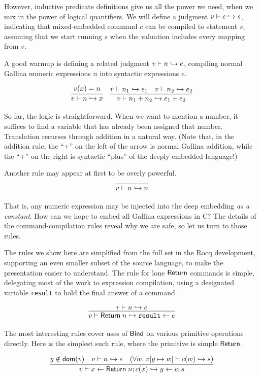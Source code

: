 \documentclass{amsbook}
\theoremstyle{definition}
\theoremstyle{remark}
\numberwithin{section}{chapter}
\numberwithin{equation}{chapter}
\begin{document}
However, inductive predicate definitions give us all the power we need, when we mix in the power of logical quantifiers.
We will define a judgment $v \vdash c \hookrightarrow s$, indicating that mixed-embedded command $c$ can be compiled to statement $s$, assuming that we start running $s$ when the valuation includes every mapping from $v$.

A good warmup is defining a related judgment $v \vdash n \hookrightarrow e$, compiling normal Gallina numeric expressions $n$ into syntactic expressions $e$.

$$\infer{\dscomp{v}{n}{x}}{
  v(x) = n
}
\quad \infer{\dscomp{v}{n_1 + n_2}{e_1 + e_2}}{
  \dscomp{v}{n_1}{e_1}
  & \dscomp{v}{n_2}{e_2}
}$$

So far, the logic is straightforward.
When we want to mention a number, it suffices to find a variable that has already been assigned that number.
Translation recurses through addition in a natural way.
(Note that, in the addition rule, the ``+'' on the left of the arrow is normal Gallina addition, while the ``+'' on the right is syntactic ``plus'' of the deeply embedded language!)

Another rule may appear at first to be overly powerful.
$$\infer{\dscomp{v}{n}{n}}{}$$

That is, any numeric expression may be injected into the deep embedding \emph{as a constant}.
How can we hope to embed all Gallina expressions in C?
The details of the command-compilation rules reveal why we are safe, so let us turn to those rules.

The rules we show here are simplified from the full set in the Rocq development, supporting an even smaller subset of the source language, to make the presentation easier to understand.
The rule for lone $\mathsf{Return}$ commands is simple, delegating most of the work to expression compilation, using a designated variable \texttt{result} to hold the final answer of a command.

$$\infer{\dscomp{v}{\mt{Return} \; n}{\assign{\texttt{result}}{e}}}{
  \dscomp{v}{n}{e}
}$$

The most interesting rules cover uses of $\mathsf{Bind}$ on various primitive operations directly.
Here is the simplest such rule, where the primitive is simple $\mathsf{Return}$.

$$\infer{\dscomp{v}{x \leftarrow \mt{Return} \; n; c(x)}{\assign{y}{e}; s}}{
    y \notin \dom{v}
    & \dscomp{v}{n}{e}
    & (\forall w. \; \dscomp{\mupd{v}{y}{w}}{c(w)}{s})
}$$
\end{document}
